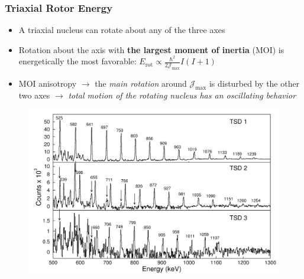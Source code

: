 \documentclass{beamer}
\begin{document}
\begin{frame}
  \frametitle{Triaxial Rotor Energy}
  \begin{itemize}
    \item A triaxial nucleus can rotate about any of the three axes
    \item Rotation about the axis with \textbf{the largest moment of inertia} (MOI) is energetically the most favorable: $E_\text{rot}\propto\frac{\hbar^2}{2\mathcal{J}_\text{max}}I(I+1 )$
    \item MOI anisotropy $\rightarrow$ the \emph{main rotation} around $\mathcal{J}_\text{max}$ is disturbed by the other two axes $\rightarrow$ {\color{red}\emph{total motion of the rotating nucleus has an oscillating behavior}}
  \end{itemize}
  \begin{figure}
    \centering
    \includegraphics[scale=0.1]{Figs/collective-spectra.pdf}

\end{figure}
\end{frame}
\end{document}
